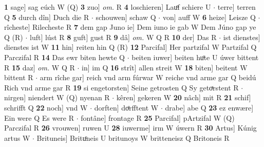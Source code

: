 \documentclass[8pt,a4paper,notitlepage]{article}
\begin{document}
\begin{table}[ht]
\begin{minipage}[t]{0.5\linewidth}
\textbf{1} sage] sag eúch W (Q) \textbf{3} zuo] \textit{om.} R \textbf{4} loschieren] Lauͦf schiere U  $\cdot$ terre] terren Q \textbf{5} durch dîn] Duch die R  $\cdot$ schouwen] schaw Q  $\cdot$ von] auff W \textbf{6} heize] Leisze Q  $\cdot$ rîcheste] Rilecheste R \textbf{7} dem gap Juno ie] Dem iuno ie gab W Dem Júno gap ye Q (R)  $\cdot$ luft] lúst R \textbf{8} guft] gust R \textbf{9} dâ] \textit{om.} W Q R \textbf{10} der] Das R  $\cdot$ ist dienstes] dienstes ist W \textbf{11} hin] reiten hin Q (R) \textbf{12} Parcifal] Her partzifal W Partzifal Q Parczifal R \textbf{14} Das ewr biten hewte Q  $\cdot$ beiten iuwer] beiten huͦte U úwer bittent R \textbf{15} daz] \textit{om.} W Q R  $\cdot$ in] im Q \textbf{16} strît] allen streit W \textbf{18} biten] beitent W bittent R  $\cdot$ arm rîche gar] reich vnd arm fúrwar W reiche vnd arme gar Q beidú Rich vnd arme gar R \textbf{19} si engetorsten] Seine getrosten Q Sy getoͯrstent R  $\cdot$ nirgen] niendert W (Q) nyenan R  $\cdot$ kêren] gekeren W \textbf{20} nâch] mit R \textbf{21} schif] schrifft Q \textbf{22} noch] vnd W  $\cdot$ dorften] doͤrfftent W  $\cdot$ drabe] abe Q \textbf{23} ez enwære] Ein were Q Es were R  $\cdot$ fontâne] frontage R \textbf{25} Parcifal] pArtzifal W (Q) Parczifal R \textbf{26} vrouwen] ruwen U \textbf{28} iuwerme] irm W úwern R \textbf{30} Artus] Kúnig artus W  $\cdot$ Brituneis] Brituͦneis U britunoys W britteneisz Q Britoneis R \newline
\end{minipage}
\end{table}
\end{document}
